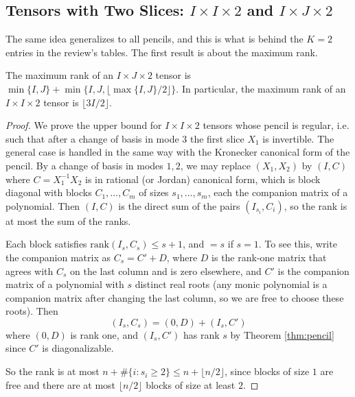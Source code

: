 \subsection{Tensors with Two Slices: $I \times I \times 2$ and $I \times J \times 2$}

  The same idea generalizes to all pencils, and this is what is behind the $K = 2$ entries in the review's tables. The first result is about the maximum rank.

  \begin{theorem}[Kruskal; J\'aJ\'a]
    \label{thm:max-pencil}
    The maximum rank of an $I \times J \times 2$ tensor is $\min\{I, J\} + \min\{I, J, \lfloor \max\{I, J\}/2 \rfloor\}$. In particular, the maximum rank of an $I \times I \times 2$ tensor is $\lfloor 3I/2 \rfloor$.
  \end{theorem}
  \begin{proof}
    We prove the upper bound for $I \times I \times 2$ tensors whose pencil is regular, i.e. such that after a change of basis in mode $3$ the first slice $X_1$ is invertible. The general case is handled in the same way with the Kronecker canonical form of the pencil. By a change of basis in modes $1, 2$, we may replace $(X_1, X_2)$ by $(I, C)$ where $C = X_1^{-1} X_2$ is in rational (or Jordan) canonical form, which is block diagonal with blocks $C_1, \ldots, C_m$ of sizes $s_1, \ldots, s_m$, each the companion matrix of a polynomial. Then $(I, C)$ is the direct sum of the pairs $(I_{s_i}, C_i)$, so the rank is at most the sum of the ranks.

    Each block satisfies $\mathrm{rank}(I_s, C_s) \leq s + 1$, and $= s$ if $s = 1$. To see this, write the companion matrix as $C_s = C' + D$, where $D$ is the rank-one matrix that agrees with $C_s$ on the last column and is zero elsewhere, and $C'$ is the companion matrix of a polynomial with $s$ distinct real roots (any monic polynomial is a companion matrix after changing the last column, so we are free to choose these roots). Then
    \begin{equation}
      (I_s, C_s) = (0, D) + (I_s, C')
    \end{equation}
    where $(0, D)$ is rank one, and $(I_s, C')$ has rank $s$ by Theorem \ref{thm:pencil} since $C'$ is diagonalizable.

    So the rank is at most $n + \#\{i : s_i \geq 2\} \leq n + \lfloor n/2 \rfloor$, since blocks of size $1$ are free and there are at most $\lfloor n/2 \rfloor$ blocks of size at least $2$.
  \end{proof}

